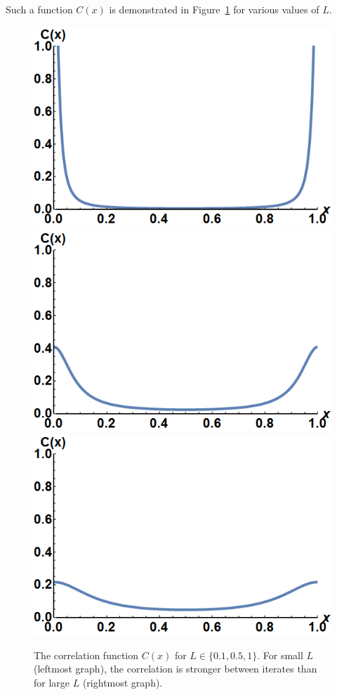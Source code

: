 Such a function $C(x)$ is demonstrated in Figure~\ref{fig:correlation}
for various values of $L$.
\begin{figure}[htp]
\caption[The correlation function $C(x)$]{The correlation function
  $C(x)$ for $L \in \{0.1,0.5,1\}$. For small $L$
  (leftmost graph), the correlation is stronger between iterates than for large $L$
  (rightmost graph).}\label{fig:correlation}
\centering
\includegraphics[width=.3\textwidth]{figs/correlation_L01.png}\hfill
\includegraphics[width=.3\textwidth]{figs/correlation_L05.png}\hfill
\includegraphics[width=.3\textwidth]{figs/correlation_L1.png}
\end{figure}


